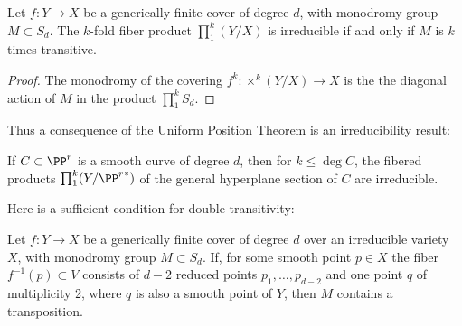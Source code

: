 \begin{lemma}\label{transitivity lemma}
Let $f : Y \to X$ be a generically finite cover of degree $d$, with  monodromy group $M \subset S_d$.
The $k$-fold fiber product $\prod_1^k(Y/X)$ is irreducible if and only if $M$ is $k$ times transitive.
\end{lemma}

\begin{proof}
The monodromy of the covering $f^k: \times^k(Y/X) \to X$ is the the diagonal action of
$M$ in the product $\prod_1^k S_d$.
\end{proof}

Thus a consequence of the Uniform Position Theorem is an irreducibility result:

\begin{corollary} If $C\subset \PP^r$ is a smooth curve of degree $d$, then 
for $k\leq \deg C$, the fibered products $\prod_1^k(Y/{\PP^r}^*)$  of the general hyperplane section 
of $C$ are irreducible.
\end{corollary}

Here is a sufficient condition for double transitivity:

\begin{lemma}\label{transposition lemma}
Let $f : Y \to X$ be a generically finite cover of degree $d$ over an irreducible variety $X$, with  monodromy group $M \subset S_d$.  
If,  for some smooth point $p \in X$ the fiber $f^{-1}(p)\subset V$ consists of $d-2$ reduced points $p_1,\dots, p_{d-2}$ and one point $q$ of multiplicity 2, where $q$ is also a smooth point of $Y$, then $M$ contains a transposition.
\end{lemma}

